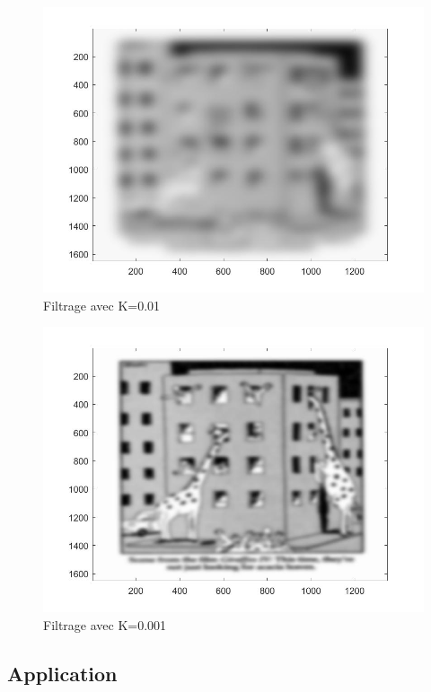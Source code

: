 \documentclass[10pt,a4paper]{article}
\begin{document}
\begin{figure}[H]	\begin{center}
\includegraphics[scale=0.35]{imfiltree_k=0.01.jpg}
\caption{Filtrage avec K=0.01}
\label{s1demod}
\end{center}	\end{figure}

\begin{figure}[H]	\begin{center}
\includegraphics[scale=0.35]{imfiltree_k=0.001.jpg}
\caption{Filtrage avec K=0.001}
\label{s1demod}
\end{center}	\end{figure}

\subsection{Application}
\end{document}
